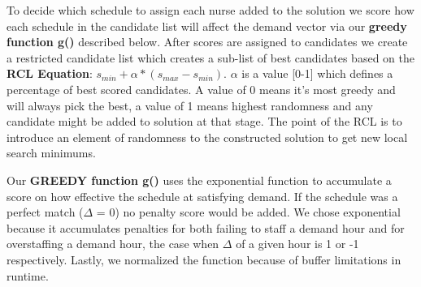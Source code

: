 \documentclass[11pt]{article}
\begin{document}
To decide which schedule to assign each nurse added to the solution we score how each schedule in the candidate list will
affect the demand vector via our {\bf greedy function g()} described below. After scores are assigned to candidates
we create a restricted candidate list which creates a sub-list of best candidates based on the {\bf RCL Equation}: 
$s_{min} + \alpha*(s_{max}-s_{min})$. $\alpha$ is a value [0-1] which defines a percentage of best scored candidates. A value
of 0 means it's most greedy and will always pick the best, a value of 1 means highest randomness and any candidate might be added to solution
at that stage. The point of the RCL is to introduce an element of randomness to the constructed solution to get new local search minimums.\\


Our {\bf GREEDY function g()} uses the exponential function to accumulate a score on how effective the schedule at satisfying demand.
If the schedule was a perfect match ($\Delta$ = 0) no penalty score would be added. We chose exponential because it accumulates penalties for both failing to staff a demand
hour and for overstaffing a demand hour, the case when $\Delta$ of a given hour is 1 or -1 respectively. Lastly, we normalized the function because of buffer limitations in runtime.\\

\end{document}
